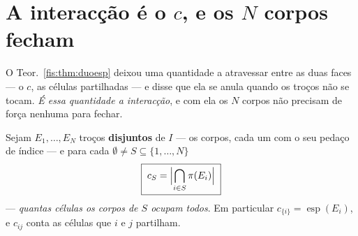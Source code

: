 \documentclass[livro.tex]{subfiles}
\begin{document}
\section{A interacção é o $c$, e os $N$ corpos fecham}\label{fis:topo-interacao}

\noindent O Teor.~\ref{fis:thm:duoesp} deixou uma quantidade a atravessar entre as
duas faces --- o $c$, as células partilhadas --- e disse que ela se anula quando
os troços não se tocam. \emph{É essa quantidade a interacção}, e com ela os $N$
corpos não precisam de força nenhuma para fechar.

\begin{definicao}\label{fis:def:corpos}
Sejam $E_1,\dots,E_N$ troços \textbf{disjuntos} de $I$ --- os corpos, cada um com
o seu pedaço de índice --- e para cada $\emptyset\neq S\subseteq\{1,\dots,N\}$
\[
\boxed{\;c_S=\Bigl\lvert\bigcap_{i\in S}\pi(E_i)\Bigr\rvert\;}
\]
--- \emph{quantas células os corpos de $S$ ocupam todos}. Em particular
$c_{\{i\}}=\operatorname{esp}(E_i)$, e $c_{ij}$ conta as células que $i$ e $j$
partilham.
\end{definicao}
\end{document}
